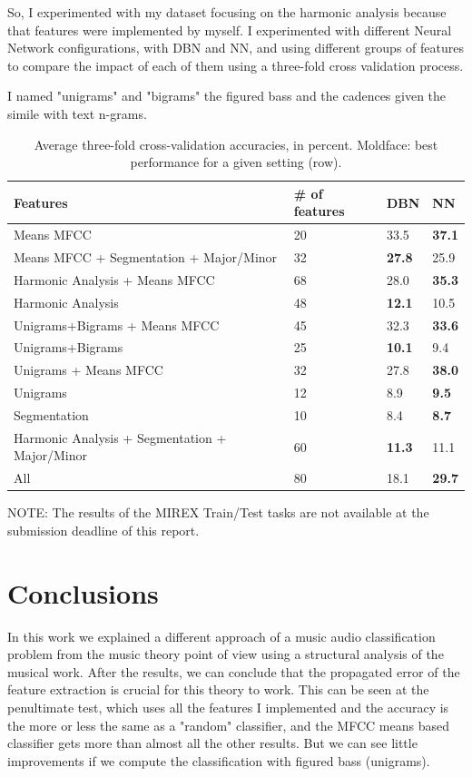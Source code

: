 \documentclass[a4paper,openany,oneside,12pt]{book}
\begin{document}
So, I experimented with my dataset focusing on the harmonic analysis because that features were implemented by myself. I experimented with different Neural Network configurations, with DBN and NN, and using different groups of features to compare the impact of each of them using a three-fold cross validation process.

I named "unigrams" and "bigrams" the figured bass and the cadences given the simile with text n-grams.


\begin{table}
\centering

   \begin{tabular}{ | l | l || l | l |}
   \hline
   Features & \# of features & DBN & NN \\ \hline
   Means MFCC & 20 & 33.5 & \bf{37.1} \\ \hline
   Means MFCC + Segmentation + Major/Minor & 32 & \bf{27.8} & 25.9 \\ \hline
   Harmonic Analysis + Means MFCC & 68 & 28.0 & \bf{35.3}\\ \hline
   Harmonic Analysis & 48 & \bf{12.1} & 10.5 \\ \hline
   Unigrams+Bigrams + Means MFCC & 45 & 32.3 & \bf{33.6} \\ \hline
   Unigrams+Bigrams & 25 & \bf{10.1} & 9.4 \\ \hline
   Unigrams + Means MFCC & 32 & 27.8 & \bf{38.0} \\ \hline
   Unigrams & 12 & 8.9 & \bf{9.5} \\ \hline
   Segmentation & 10 & 8.4 & \bf{8.7} \\ \hline
   Harmonic Analysis + Segmentation + Major/Minor & 60 & \bf{11.3} & 11.1 \\ \hline
   All & 80 & 18.1 & \bf{29.7} \\ \hline
   \end{tabular}

\caption{Average three-fold cross-validation accuracies, in percent. Moldface: best performance for a given setting (row).} \label{fig:results}
\end{table}


NOTE: The results of the MIREX Train/Test tasks are not available at the submission deadline of this report.

\newpage
\thispagestyle{empty}
\mbox{}


\chapter{Conclusions}\label{conclusions}
In this work we explained a different approach of a music audio classification problem from the music theory point of view using a structural analysis of the musical work. After the results, we can conclude that the propagated error of the feature extraction is crucial for this theory to work. This can be seen at the penultimate test, which uses all the features I implemented and the accuracy is the more or less the same as a "random" classifier, and the MFCC means based classifier gets more than almost all the other results. But we can see little improvements if we compute the classification with figured bass (unigrams).
\end{document}
